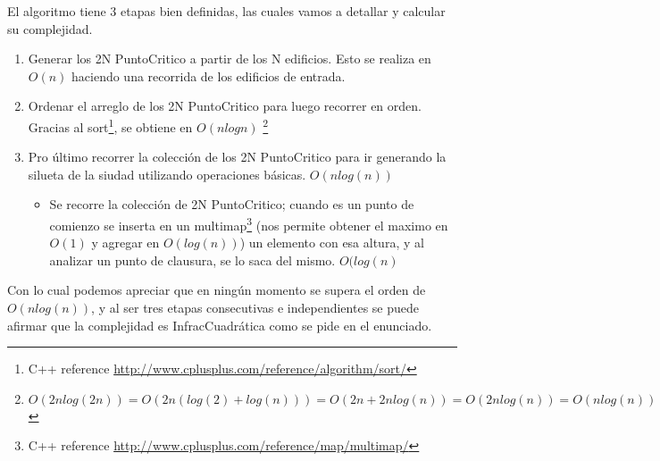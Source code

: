 El algoritmo tiene 3 etapas bien definidas, las cuales vamos a detallar y calcular su complejidad.

\begin{enumerate}[I]
	\item Generar los 2N PuntoCritico a partir de los N edificios. Esto se realiza en $O(n)$ haciendo una recorrida de los edificios de entrada.
	\item Ordenar el arreglo de los 2N PuntoCritico para luego recorrer en orden. Gracias al sort\footnote{C++ reference \url{http://www.cplusplus.com/reference/algorithm/sort/}}, se obtiene en $O(nlogn)$ \footnote{$O(2n log(2n)) = O(2n (log(2)+log(n))) = O(2n+2n log(n)) = O(2n log(n)) = O(n log(n)) $}
	\item Pro último recorrer la colección de los 2N PuntoCritico para ir generando la silueta de la siudad utilizando operaciones básicas. $O(n log(n))$
	\begin{itemize}
		\item Se recorre la colección de 2N PuntoCritico; cuando es un punto de comienzo se inserta en un multimap\footnote{C++ reference \url{http://www.cplusplus.com/reference/map/multimap/}} (nos permite obtener el maximo en $O(1)$ y agregar en $O(log(n))$) un elemento con esa altura, y al analizar un punto de clausura, se lo saca del mismo. $O(log(n)$
	\end{itemize}
\end{enumerate}

Con lo cual podemos apreciar que en ningún momento se supera el orden de $O (n log(n))$, y al ser tres etapas consecutivas e independientes se puede afirmar que la complejidad es InfracCuadrática como se pide en el enunciado.